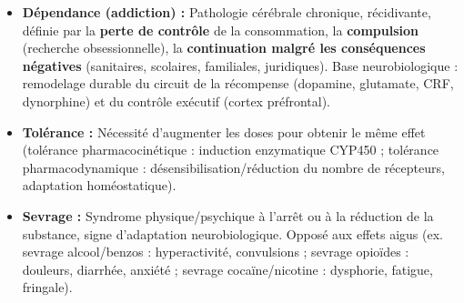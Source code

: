 \documentclass[11pt]{article}
\begin{document}
\begin{definition}
\begin{itemize}
    \item \textbf{Dépendance (addiction) :} Pathologie cérébrale chronique, récidivante, définie par la \textbf{perte de contrôle} de la consommation, la \textbf{compulsion} (recherche obsessionnelle), la \textbf{continuation malgré les conséquences négatives} (sanitaires, scolaires, familiales, juridiques). Base neurobiologique : remodelage durable du circuit de la récompense (dopamine, glutamate, CRF, dynorphine) et du contrôle exécutif (cortex préfrontal).
    \item \textbf{Tolérance :} Nécessité d'augmenter les doses pour obtenir le même effet (tolérance pharmacocinétique : induction enzymatique CYP450 ; tolérance pharmacodynamique : désensibilisation/réduction du nombre de récepteurs, adaptation homéostatique).
    \item \textbf{Sevrage :} Syndrome physique/psychique à l'arrêt ou à la réduction de la substance, signe d'adaptation neurobiologique. Opposé aux effets aigus (ex. sevrage alcool/benzos : hyperactivité, convulsions ; sevrage opioïdes : douleurs, diarrhée, anxiété ; sevrage cocaïne/nicotine : dysphorie, fatigue, fringale).
\end{itemize}
\end{definition}
\end{document}
